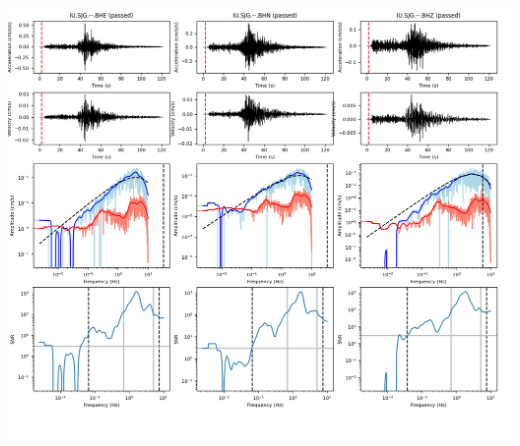 \documentclass[9pt]{article}
\begin{document}
\includegraphics[height=5.75in]
    {plots/19930722204115_IU.SJG.BH.png}
\end{document}
